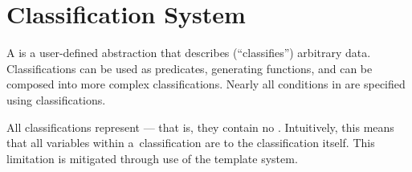 %
%

\section{Classification System}

A  is a user-defined abstraction that describes
  (``classifies'') arbitrary data.
Classifications can be used as predicates, generating functions, and can be
  composed into more complex classifications.
Nearly all conditions in \tame{} are specified using classifications.

All classifications represent ---%
  that is,
    they contain no .
Intuitively,
  this means that all variables within a~classification are
   to the classification itself.
This limitation is mitigated through use of the template system.

